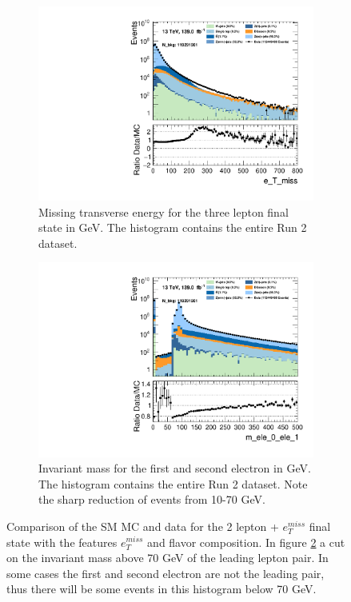\begin{figure}[h!]
    \centering
    \begin{subfigure}{.6\textwidth}
        \includegraphics[width=\textwidth]{Figures/MC_Data_comp/lep2/e_T_miss_2lep.pdf}
        \caption{Missing transverse energy for the three lepton final state in GeV. The histogram contains the entire Run 2 dataset.}
        \label{fig:etmiss_2lep}
    \end{subfigure}
    \hfill
    \begin{subfigure}{.6\textwidth}
        \includegraphics[width=\textwidth]{Figures/MC_Data_comp/lep2/m_ele_0_ele_1_2lep.pdf}
        \caption{Invariant mass for the first and second electron in GeV. The histogram contains the entire Run 2 dataset. Note the sharp reduction of events from 10-70 GeV.}
        \label{fig:mll_2lep}
    \end{subfigure}
    \hfill        
    \caption[2 lepton + $e_T^{miss}$ Monte Carlo and ATLAS data comparison]{Comparison of the SM MC and data for the 2 lepton + $e_T^{miss}$ final 
    state with the features $e_{T}^{miss}$ and flavor composition. In figure \ref{fig:mll_2lep} a cut on the invariant mass above 70 GeV of the leading lepton
    pair. In some cases the first and second electron are not the leading pair, thus there will be some events in this histogram below 70 GeV. 
    }
    \label{fig:MC_Data_comp_2lep}
\end{figure}

